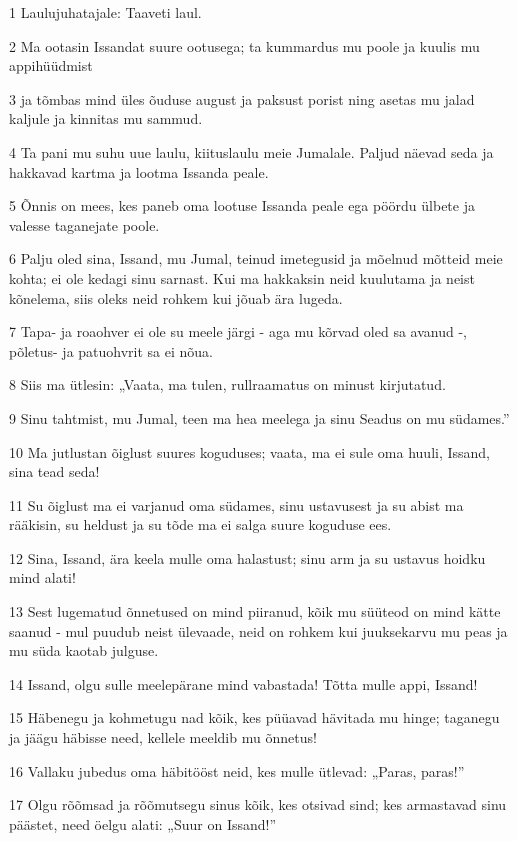 \par 1 Laulujuhatajale: Taaveti laul.
\par 2 Ma ootasin Issandat suure ootusega; ta kummardus mu poole ja kuulis mu appihüüdmist
\par 3 ja tõmbas mind üles õuduse august ja paksust porist ning asetas mu jalad kaljule ja kinnitas mu sammud.
\par 4 Ta pani mu suhu uue laulu, kiituslaulu meie Jumalale. Paljud näevad seda ja hakkavad kartma ja lootma Issanda peale.
\par 5 Õnnis on mees, kes paneb oma lootuse Issanda peale ega pöördu ülbete ja valesse taganejate poole.
\par 6 Palju oled sina, Issand, mu Jumal, teinud imetegusid ja mõelnud mõtteid meie kohta; ei ole kedagi sinu sarnast. Kui ma hakkaksin neid kuulutama ja neist kõnelema, siis oleks neid rohkem kui jõuab ära lugeda.
\par 7 Tapa- ja roaohver ei ole su meele järgi - aga mu kõrvad oled sa avanud -, põletus- ja patuohvrit sa ei nõua.
\par 8 Siis ma ütlesin: „Vaata, ma tulen, rullraamatus on minust kirjutatud.
\par 9 Sinu tahtmist, mu Jumal, teen ma hea meelega ja sinu Seadus on mu südames.”
\par 10 Ma jutlustan õiglust suures koguduses; vaata, ma ei sule oma huuli, Issand, sina tead seda!
\par 11 Su õiglust ma ei varjanud oma südames, sinu ustavusest ja su abist ma rääkisin, su heldust ja su tõde ma ei salga suure koguduse ees.
\par 12 Sina, Issand, ära keela mulle oma halastust; sinu arm ja su ustavus hoidku mind alati!
\par 13 Sest lugematud õnnetused on mind piiranud, kõik mu süüteod on mind kätte saanud - mul puudub neist ülevaade, neid on rohkem kui juuksekarvu mu peas ja mu süda kaotab julguse.
\par 14 Issand, olgu sulle meelepärane mind vabastada! Tõtta mulle appi, Issand!
\par 15 Häbenegu ja kohmetugu nad kõik, kes püüavad hävitada mu hinge; taganegu ja jäägu häbisse need, kellele meeldib mu õnnetus!
\par 16 Vallaku jubedus oma häbitööst neid, kes mulle ütlevad: „Paras, paras!”
\par 17 Olgu rõõmsad ja rõõmutsegu sinus kõik, kes otsivad sind; kes armastavad sinu päästet, need öelgu alati: „Suur on Issand!”

